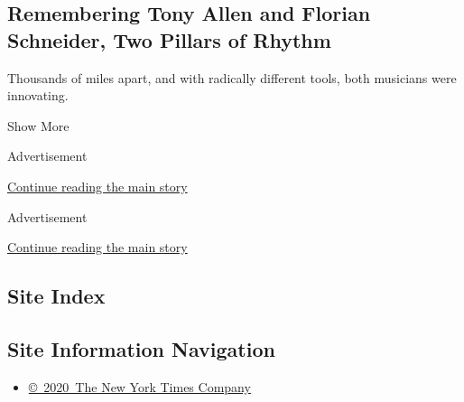 \begin{enumerate}
  \hypertarget{remembering-tony-allen-and-florian-schneider-two-pillars-of-rhythm}{%
  \subsection{Remembering Tony Allen and Florian Schneider, Two Pillars
  of
  Rhythm}\label{remembering-tony-allen-and-florian-schneider-two-pillars-of-rhythm}}

  Thousands of miles apart, and with radically different tools, both
  musicians were innovating.
\end{enumerate}

Show More

Advertisement

\protect\hyperlink{after-mid1}{Continue reading the main story}

Advertisement

\protect\hyperlink{after-mktg}{Continue reading the main story}

\hypertarget{site-index}{%
\subsection{Site Index}\label{site-index}}

\hypertarget{site-information-navigation}{%
\subsection{Site Information
Navigation}\label{site-information-navigation}}

\begin{itemize}
\tightlist
\item
  \href{https://help.nytimes3xbfgragh.onion/hc/en-us/articles/115014792127-Copyright-notice}{©~2020~The
  New York Times Company}
\end{itemize}

